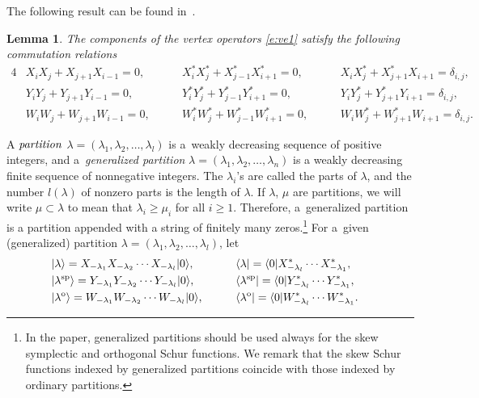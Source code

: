 \documentclass[pdftex]{sigma}
\numberwithin{equation}{section}
\newtheorem{Lemma}[Theorem]{Lemma}
\begin{document}
The following result can be found in~\cite[Theorem~3.4, Proposition~3.6]{JN2015}.
\begin{Lemma}The components of the vertex operators \eqref{e:ve1} satisfy the following commutation relations
\begin{alignat}{4}
&X_iX_j+X_{j+1}X_{i-1}=0,\quad\ && X^*_iX^*_j+X^*_{j-1}X^*_{i+1}=0,\quad\ && X_iX^*_j+X^*_{j+1}X_{i+1}=\delta_{i,j},&\nonumber\\
&Y_iY_j+Y_{j+1}Y_{i-1}=0,\quad\ && Y^*_iY^*_j+Y^*_{j-1}Y^*_{i+1}=0,\quad\ && Y_iY^*_j+Y^*_{j+1}Y_{i+1}=\delta_{i,j},&\label{e:com}\\
&W_iW_j+W_{j+1}W_{i-1}=0,\quad\ && W^*_iW^*_j+W^*_{j-1}W^*_{i+1}=0,\quad\ && W_iW^*_j+W^*_{j+1}W_{i+1}=\delta_{i,j}.&\nonumber
\end{alignat}
\end{Lemma}
A ${\it partition}$ $\lambda=(\lambda_1,\lambda_2,\dots,\lambda_l)$ is a~weakly decreasing sequence of positive integers, and
a~{\it generalized partition} $\lambda=(\lambda_1,\lambda_2,\dots,\lambda_n)$ is a weakly decreasing finite sequence of nonnegative integers. The $\lambda_i$'s are
called the parts of $\lambda$, and the number $l(\lambda)$ of nonzero parts is the length of $\lambda$. If $\lambda$, $\mu$ are partitions, we will write $\mu\subset\lambda$ to mean that $\lambda_i\geq \mu_i$ for all $i\geq 1$. Therefore, a~generalized partition is a partition appended with
a string of finitely many zeros.\footnote{In the paper, generalized partitions should be used always for the skew symplectic and orthogonal Schur functions. We remark that the skew Schur functions
indexed by generalized partitions coincide with those indexed by ordinary partitions.} For a~given (generalized) partition $\lambda=(\lambda_1,\lambda_2,\dots,\lambda_l)$, let
\begin{alignat}{3}
\label{e:sc2}&|\lambda\rangle=X_{-\lambda_1}X_{-\lambda_2}\cdots X_{-\lambda_l}|0\rangle,\qquad&& \langle \lambda|=\langle 0|X^*_{-\lambda_l}\cdots X^*_{-\lambda_1},&\\
\label{e:sp6}&|\lambda^{\rm sp}\rangle=Y_{-\lambda_1}Y_{-\lambda_2}\cdots Y_{-\lambda_l}|0\rangle, \qquad&&\langle \lambda^{\rm sp}|=\langle 0|Y^*_{-\lambda_l}\cdots Y^*_{-\lambda_1},&\\
\label{e:o6}&|\lambda^{\rm o}\rangle=W_{-\lambda_1}W_{-\lambda_2}\cdots W_{-\lambda_l}|0\rangle,\qquad&&\langle \lambda^{\rm o}|=\langle 0|W^*_{-\lambda_l}\cdots W^*_{-\lambda_1}.&
\end{alignat}
\end{document}
